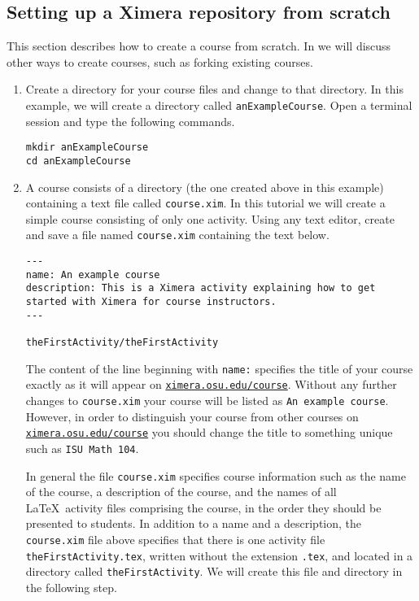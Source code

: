 \documentclass{ximera}
\begin{document}
\subsection{Setting up a Ximera repository from scratch}
This section describes how to create a course from scratch.
In  we will discuss other ways to create
courses, such as forking existing courses.
\begin{enumerate}
\item\label{Mkdir} Create a directory for your course files
and change to that directory.
In this example, we will create a directory called
\verb!anExampleCourse!.
Open a terminal session and type the following commands.
\begin{center}
\begin{verbatim}
mkdir anExampleCourse
cd anExampleCourse 
\end{verbatim}
\end{center}

\item A  
course consists of a directory (the one
created above in this example)
containing a text file called \verb!course.xim!. 
In this tutorial we will create a simple
course consisting of only one activity.
Using any text editor, create and save a file named
\verb!course.xim! containing the text below.

\begin{verbatim}
---
name: An example course
description: This is a Ximera activity explaining how to get started with Ximera for course instructors.
---

theFirstActivity/theFirstActivity
\end{verbatim}

\begin{warning}
The content of the line beginning with \verb!name:!
specifies the title of your course exactly as it will appear on
\href{http://ximera.osu.edu/course}{\tt ximera.osu.edu/course}.
Without any further changes to \verb!course.xim!
your course will be listed as \verb!An example course!.
However, in order to distinguish your course from
other courses on
\href{http://ximera.osu.edu/course}{\tt ximera.osu.edu/course}
you should change the title to something unique
such as \verb!ISU Math 104!.
\end{warning}

\begin{remark}
In general the file \verb!course.xim! specifies course information
such as the name of the course, a description of the course,
and the names of all \LaTeX\ activity files 
comprising the course, in the order
they should be presented to students.
In addition to a name and a description,
the \verb!course.xim! file above specifies that 
there is one activity file \verb!theFirstActivity.tex!,
written without the extension \verb!.tex!,  
and located in a directory called \verb!theFirstActivity!.
We will create this file and directory in the following step.


\end{remark}
\end{enumerate}
\end{document}
